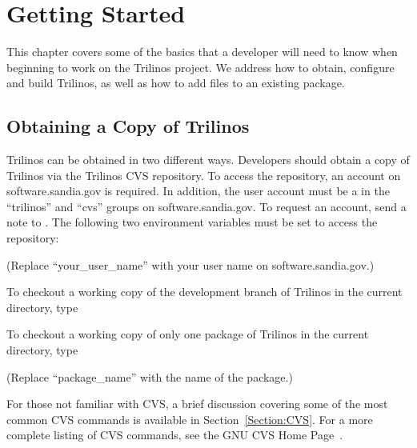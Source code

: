 \documentclass[12pt,relax]{TrilinosDevGuide}
\begin{document}
\section{Getting Started}
\label{Section:GettingStarted}

This chapter covers some of the basics that a developer will need to know when 
beginning to work on the Trilinos project.  We address how to obtain, 
configure and build Trilinos, as well as how to add files to an 
existing package.


\subsection{Obtaining a Copy of Trilinos}

Trilinos can be obtained in two different ways.  Developers should obtain a 
copy of Trilinos via the Trilinos CVS repository.  
To access the repository, an account on software.sandia.gov is required.  
In addition, the user account must be a in the ``trilinos'' and ``cvs'' groups 
on software.sandia.gov.  To request an account, send a note 
to .  The following two 
environment variables must be set to access the repository:


(Replace ``your\_user\_name'' with your user name on software.sandia.gov.)

To checkout a working copy of the development branch of Trilinos in the 
current directory, type


To checkout a working copy of only one package of Trilinos in the 
current directory, type


(Replace ``package\_name'' with the name of the package.)

For those not familiar with CVS, a brief discussion covering some of the most 
common CVS commands is available in Section~\ref{Section:CVS}.  For a more 
complete listing of CVS commands, see the GNU CVS Home Page~\cite{CVS}.
\end{document}
